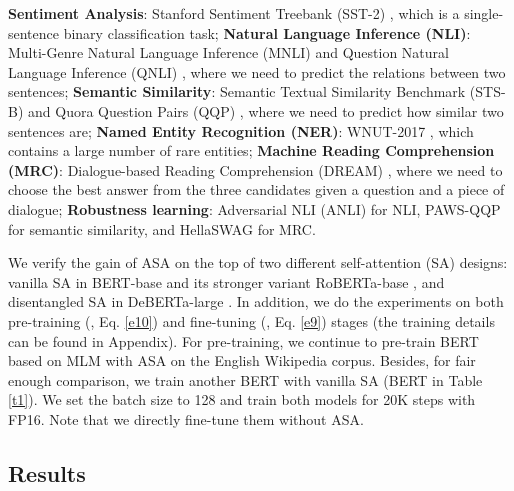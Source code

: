 \documentclass[letterpaper]{article} \usepackage{aaai23}  \usepackage{times}  \usepackage{helvet}  \usepackage{courier}  \usepackage[hyphens]{url}  \usepackage{graphicx} \urlstyle{rm} \def\UrlFont{\rm}  \usepackage{natbib}  \usepackage{caption} \frenchspacing  \setlength{\pdfpagewidth}{8.5in}  \setlength{\pdfpageheight}{11in}  \usepackage{algorithm}
\begin{document}
 \textbf{Sentiment Analysis}: Stanford Sentiment Treebank (SST-2) \citep{DBLP:conf/emnlp/SocherPWCMNP13}, which is a single-sentence binary classification task;
 \textbf{Natural Language Inference (NLI)}: Multi-Genre Natural Language Inference (MNLI) \citep{DBLP:conf/naacl/WilliamsNB18} and Question Natural Language Inference (QNLI) \citep{DBLP:conf/iclr/WangSMHLB19}, where we need to predict the relations between two sentences;
 \textbf{Semantic Similarity}: Semantic Textual Similarity Benchmark (STS-B) \citep{DBLP:conf/semeval/CerDALS17} and Quora Question Pairs (QQP) \citep{DBLP:conf/iclr/WangSMHLB19}, where we need to predict how similar two sentences are;
 \textbf{Named Entity Recognition (NER)}: WNUT-2017 \citep{DBLP:conf/aclnut/AguilarMLS17}, which contains a large number of rare entities;
 \textbf{Machine Reading Comprehension (MRC)}: Dialogue-based Reading Comprehension (DREAM) \citep{DBLP:journals/tacl/SunYCYCC19}, where we need to choose the best answer from the three candidates given a question and a piece of dialogue;
 \textbf{Robustness learning}: Adversarial NLI (ANLI) \citep{DBLP:conf/acl/NieWDBWK20} for NLI, PAWS-QQP \citep{DBLP:conf/naacl/ZhangBH19} for semantic similarity, and HellaSWAG \citep{DBLP:conf/acl/ZellersHBFC19} for MRC.

We verify the gain of ASA on the top of two different self-attention (SA) designs: vanilla SA in BERT-base \citep{DBLP:conf/naacl/DevlinCLT19} and its stronger variant RoBERTa-base \citep{DBLP:journals/corr/abs-1907-11692}, and disentangled SA in DeBERTa-large \citep{DBLP:conf/iclr/HeLGC21}. In addition, we do the experiments on both pre-training (, Eq. \ref{e10}) and fine-tuning (, Eq. \ref{e9}) stages (the training details can be found in Appendix). For pre-training, we continue to pre-train BERT based on MLM with ASA on the English Wikipedia corpus. Besides, for fair enough comparison, we train another BERT with vanilla SA (BERT in Table \ref{t1}). We set the batch size to 128 and train both models for 20K steps with FP16. Note that we directly fine-tune them without ASA.

\subsection{Results}
\end{document}

